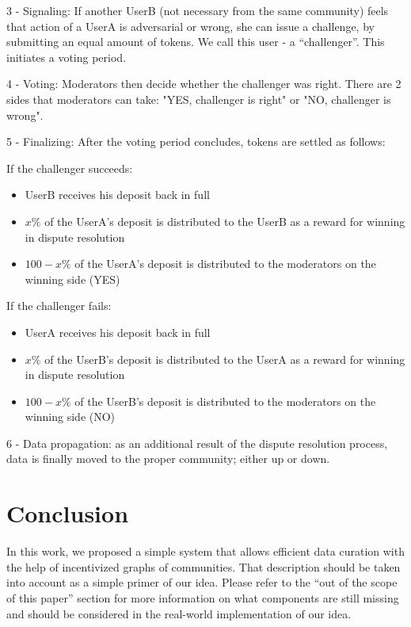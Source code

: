 \documentclass[10pt,a4paper]{article}
\begin{document}
3 - Signaling: If another UserB (not necessary from the same community) feels that action of a UserA is adversarial or wrong, she can issue a challenge, by submitting an equal amount of tokens. We call this user - a “challenger”. This initiates a voting period.

4 - Voting: Moderators then decide whether the challenger was right. There are 2 sides that moderators can take: "YES, challenger is right" or "NO, challenger is wrong".

5 - Finalizing: After the voting period concludes, tokens are settled as follows:\newline

If the challenger succeeds:
\begin{itemize}
    \item UserB receives his deposit back in full
    \item \(x\%\) of the UserA’s deposit is distributed to the UserB as a reward for winning in dispute resolution
    \item \(100-x\%\) of the UserA’s deposit is distributed to the moderators on the winning side (YES)
\end{itemize}

If the challenger fails:
\begin{itemize}
    \item UserA receives his deposit back in full
    \item \(x\%\) of the UserB’s deposit is distributed to the UserA as a reward for winning in dispute resolution
    \item \(100-x\%\) of the UserB’s deposit is distributed to the moderators on the winning side (NO)
\end{itemize}

6 - Data propagation: as an additional result of the dispute resolution process, data is finally moved to the proper community; either up or down.

\section{Conclusion}

In this work, we proposed a simple system that allows efficient data curation with the help of incentivized graphs of communities. That description should be taken into account as a simple primer of our idea. Please refer to the “out of the scope of this paper” section for more information on what components are still missing and should be considered in the real-world implementation of our idea.
\end{document}
